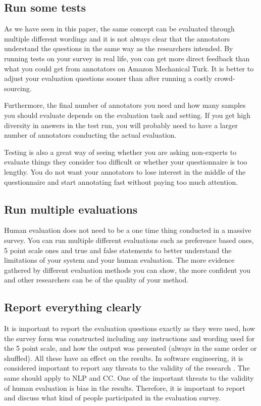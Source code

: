 \documentclass[11pt,a4paper]{article}
\begin{document}
\subsection{Run some tests}

As we have seen in this paper, the same concept can be evaluated through multiple different wordings and it is not always clear that the annotators understand the questions in the same way as the researchers intended. By running tests on your survey in real life, you can get more direct feedback than what you could get from annotators on Amazon Mechanical Turk. It is better to adjust your evaluation questions sooner than after running a costly crowd-sourcing.

Furthermore, the final number of annotators you need and how many samples you should evaluate depends on the evaluation task and setting. If you get high diversity in answers in the test run, you will probably need to have a larger number of annotators conducting the actual evaluation.

Testing is also a great way of seeing whether you are asking non-experts to evaluate things they consider too difficult or whether your questionnaire is too lengthy. You do not want your annotators to lose interest in the middle of the questionnaire and start annotating fast without paying too much attention.

\subsection{Run multiple evaluations}

Human evaluation does not need to be a one time thing conducted in a massive survey. You can run multiple different evaluations such as preference based ones, 5 point scale ones and true and false statements to better understand the limitations of your system and your human evaluation. The more evidence gathered by different evaluation methods you can show, the more confident you and other researchers can be of the quality of your method.

\subsection{Report everything clearly}

It is important to report the evaluation questions exactly as they were used, how the survey form was constructed including any instructions and wording used for the 5 point scale, and how the output was presented (always in the same order or shuffled). All these have an effect on the results. In software engineering, it is considered important to report any threats to the validity of the research \cite{feldt2010validity}. The same should apply to NLP and CC. One of the important threats to the validity of human evaluation is bias in the results. Therefore, it is important to report and discuss what kind of people participated in the evaluation survey.
\end{document}

